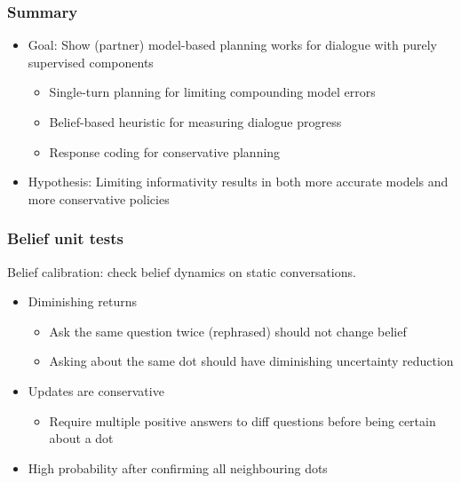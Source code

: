 \documentclass{beamer}
\begin{document}
\begin{frame}
\frametitle{Summary}
\begin{itemize}
\item Goal: Show (partner) model-based planning works for dialogue with
    purely supervised components
    \begin{itemize}
    \item Single-turn planning for limiting compounding model errors
    \item Belief-based heuristic for measuring dialogue progress
    \item Response coding for conservative planning
    \end{itemize}
\item Hypothesis: Limiting informativity results in both
    more accurate models and more conservative policies
\end{itemize}
\end{frame}

\begin{frame}
\frametitle{Belief unit tests}
Belief calibration: check belief dynamics on static conversations.
\begin{itemize}
\item Diminishing returns
    \begin{itemize}
    \item Ask the same question twice (rephrased) should not change belief
    \item Asking about the same dot should have diminishing
        uncertainty reduction
    \end{itemize}
\item Updates are conservative
    \begin{itemize}
    \item Require multiple positive answers
        to diff questions before being certain about a dot
    \end{itemize}
\item High probability after confirming all neighbouring dots
\end{itemize}
\end{frame}

\end{document}

